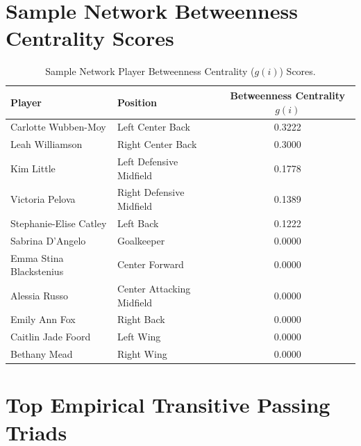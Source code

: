 \documentclass[12pt, a4paper]{article}
\begin{document}
\clearpage
\section{Sample Network Betweenness Centrality Scores}
\label{app:sample_betweenness_scores}

\begin{table}[htbp]
    \centering
    \scriptsize
    \caption{Sample Network Player Betweenness Centrality ($g(i)$) Scores.}
    \label{tab:app_sample_betweenness}
    \begin{tabularx}{0.85\textwidth}{X l c}
        \toprule
        \textbf{Player} & \textbf{Position} & \textbf{Betweenness Centrality $g(i)$} \\
        \midrule
        Carlotte Wubben-Moy & Left Center Back & 0.3222 \\
        Leah Williamson & Right Center Back & 0.3000 \\
        Kim Little & Left Defensive Midfield & 0.1778 \\
        Victoria Pelova & Right Defensive Midfield & 0.1389 \\
        Stephanie-Elise Catley & Left Back & 0.1222 \\
        Sabrina D’Angelo & Goalkeeper & 0.0000 \\
        Emma Stina Blackstenius & Center Forward & 0.0000 \\
        Alessia Russo & Center Attacking Midfield & 0.0000 \\
        Emily Ann Fox & Right Back & 0.0000 \\
        Caitlin Jade Foord & Left Wing & 0.0000 \\
        Bethany Mead & Right Wing & 0.0000 \\
        \bottomrule
    \end{tabularx}
\end{table}


\clearpage
\section{Top Empirical Transitive Passing Triads}
\label{app:empirical_triads}
\end{document}

